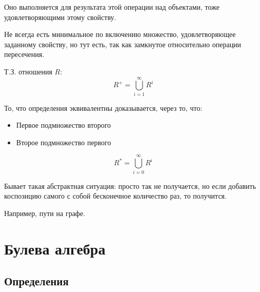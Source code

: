 \documentclass[a4paper, 12pt]{article}
\begin{document}
    \begin{definition}\nl
        Оно выполняется для результата этой операции 
        над объектами, тоже удовлетворяющими этому свойству.
    \end{definition}

    
    \begin{note}
        Не всегда есть минимальное по включению множество, 
        удовлетворяющее заданному свойству, но тут есть, 
        так как замкнутое относительно операции пересечения.
    \end{note}


    \begin{definition}\nl
        Т.З. отношения $R$:
        \begin{equation}
            R^{+} = \bigcup_{i = 1}^{\infty} R^i
        \end{equation}
    \end{definition}
    То, что определения эквивалентны доказывается, через то, что:
    \begin{itemize}
        \item Первое подмножество второго
        \item Второе подмножество первого
    \end{itemize}

    \begin{definition}[]
        \begin{equation}
            R^{*} = \bigcup_{i = 0}^{\infty} R^i
        \end{equation}
    \end{definition}
    

    \begin{note}
        Бывает такая абстрактная ситуация: 
        просто так не получается, но если добавить коспозицию 
        самого с собой бесконечное количество раз, то получится. 
        
        Например, пути на графе.
    \end{note}


    \section{Булева алгебра}

    \subsection{Определения}
\end{document}
